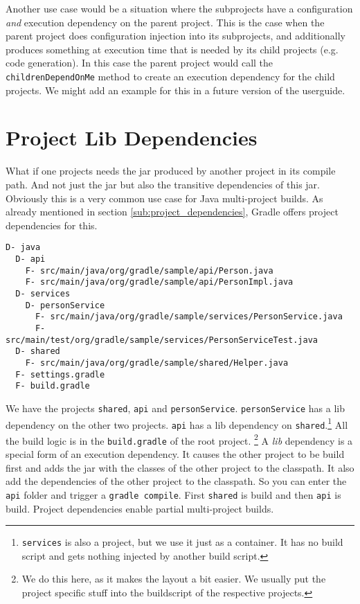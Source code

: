 Another use case would be a situation where the subprojects have a configuration \emph{and} execution dependency on the parent project. This is the case when the parent project does configuration injection into its subprojects, and additionally produces something at execution time that is needed by its child projects (e.g. code generation). In this case the parent project would call the \texttt{childrenDependOnMe} method to create an execution dependency for the child projects. We might add an example for this in a future version of the userguide.

\section{Project Lib Dependencies} %
\label{sec:project_jar_dependencies}
What if one projects needs the jar produced by another project in its compile path. And not just the jar but also the transitive dependencies of this jar. Obviously this is a very common use case for Java multi-project builds. As already mentioned in section \ref{sub:project_dependencies}, Gradle offers project dependencies for this.
\begin{Verbatim}[frame=single,label=Project Tree]
D- java
  D- api
    F- src/main/java/org/gradle/sample/api/Person.java
    F- src/main/java/org/gradle/sample/api/PersonImpl.java
  D- services
    D- personService
      F- src/main/java/org/gradle/sample/services/PersonService.java
      F- src/main/test/org/gradle/sample/services/PersonServiceTest.java
  D- shared 
    F- src/main/java/org/gradle/sample/shared/Helper.java 
  F- settings.gradle
  F- build.gradle
\end{Verbatim}
We have the projects \texttt{shared}, \texttt{api} and \texttt{personService}. \texttt{personService} has a lib dependency on the other two projects. \texttt{api} has a lib dependency on \texttt{shared}.\footnote{\texttt{services} is also a project, but we use it just as a container. It has no build script and gets nothing injected by another build script.}
All the build logic is in the \texttt{build.gradle} of the root project.
\footnote{We do this here, as it makes the layout a bit easier. We usually put the project specific stuff into the buildscript of the respective projects.} 
A \emph{lib} dependency is a special form of an execution dependency. It causes the other project to be build first and adds the jar with the classes of the other project to the classpath. It also add the dependencies of the other project to the classpath. So you can enter the \texttt{api} folder and trigger a \texttt{gradle compile}. First \texttt{shared} is build and then \texttt{api} is build. Project dependencies enable partial multi-project builds.

